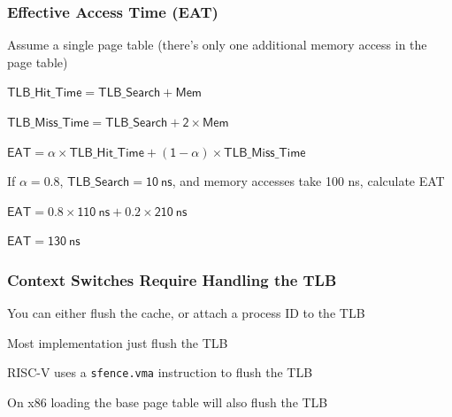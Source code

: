   \begin{frame}
    \frametitle{Effective Access Time (EAT)}

    Assume a single page table (there's only one additional memory access in the page table)

    \vspace{2em}

    $\mathsf{TLB\_Hit\_Time = TLB\_Search + Mem}$

    $\mathsf{TLB\_Miss\_Time = TLB\_Search + 2 \times Mem}$

    $\mathsf{EAT = \alpha \times TLB\_Hit\_Time + (1 - \alpha) \times TLB\_Miss\_Time}$

    \vspace{2em}

    If $\mathsf{\alpha = 0.8}$, $\mathsf{TLB\_Search = 10\ ns}$, and memory accesses take 100 ns, calculate EAT

    \hspace{2em} $\mathsf{EAT = 0.8 \times 110\ ns + 0.2 \times 210\ ns}$

    \hspace{2em} $\mathsf{EAT = 130\ ns}$
  \end{frame}

  \begin{frame}
    \frametitle{Context Switches Require Handling the TLB}

    You can either flush the cache, or attach a process ID to the TLB

    \vspace{2em}

    Most implementation just flush the TLB

    \hspace{2em} RISC-V uses a \texttt{sfence.vma} instruction to flush the TLB

    \vspace{2em}

    On x86 loading the base page table will also flush the TLB

  \end{frame}

